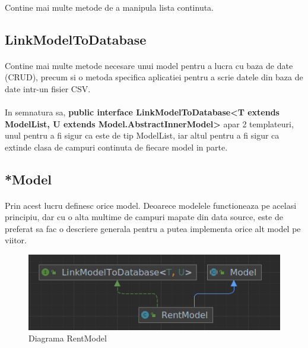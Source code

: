 \documentclass[oneside]{article}
\begin{document}
\paragraph{} Contine mai multe metode de a manipula lista continuta.

\subsection[LinkModelToDatabase]{LinkModelToDatabase}
\paragraph{} Contine mai multe metode necesare unui model pentru a lucra cu baza de date (CRUD), precum si o metoda specifica aplicatiei pentru a scrie datele din baza de date intr-un fisier CSV.

\paragraph{} In semnatura sa, \textbf{public interface LinkModelToDatabase<T extends ModelList, U extends Model.AbstractInnerModel>} apar 2 templateuri, unul pentru a fi sigur ca este de tip ModelList, iar altul pentru a fi sigur ca extinde clasa de campuri continuta de fiecare model in parte.

\subsection[*Model]{*Model}
\paragraph{} Prin acest lucru definesc orice model. Deoarece modelele functioneaza pe acelasi principiu, dar cu o alta multime de campuri mapate din data source, este de preferat sa fac o descriere generala pentru a putea implementa orice alt model pe viitor.

\begin{figure}[ht]
    \centering
    \noindent\includegraphics[scale=0.7]{rentmodel.png}
    \caption{Diagrama RentModel}
    \label{fig:rentmodel}
\end{figure}
\end{document}
